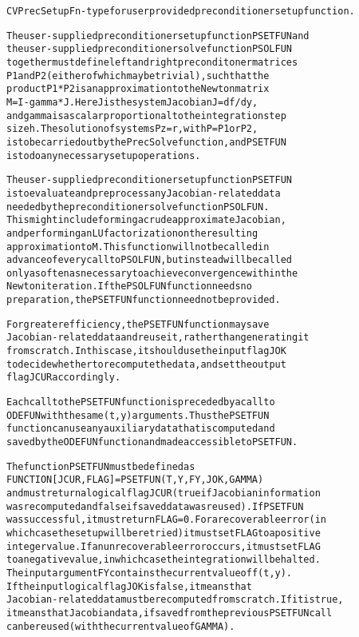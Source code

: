 \begin{alltt}
CVPrecSetupFn - type for user provided preconditioner setup function.

   The user-supplied preconditioner setup function PSETFUN and
   the user-supplied preconditioner solve function PSOLFUN
   together must define left and right preconditoner matrices
   P1 and P2 (either of which may be trivial), such that the
   product P1*P2 is an approximation to the Newton matrix
   M = I - gamma*J.  Here J is the system Jacobian J = df/dy,
   and gamma is a scalar proportional to the integration step
   size h.  The solution of systems P z = r, with P = P1 or P2,
   is to be carried out by the PrecSolve function, and PSETFUN
   is to do any necessary setup operations.

   The user-supplied preconditioner setup function PSETFUN
   is to evaluate and preprocess any Jacobian-related data
   needed by the preconditioner solve function PSOLFUN.
   This might include forming a crude approximate Jacobian,
   and performing an LU factorization on the resulting
   approximation to M.  This function will not be called in
   advance of every call to PSOLFUN, but instead will be called
   only as often as necessary to achieve convergence within the
   Newton iteration.  If the PSOLFUN function needs no
   preparation, the PSETFUN function need not be provided.

   For greater efficiency, the PSETFUN function may save
   Jacobian-related data and reuse it, rather than generating it
   from scratch.  In this case, it should use the input flag JOK
   to decide whether to recompute the data, and set the output
   flag JCUR accordingly.

   Each call to the PSETFUN function is preceded by a call to
   ODEFUN with the same (t,y) arguments.  Thus the PSETFUN
   function can use any auxiliary data that is computed and
   saved by the ODEFUN function and made accessible to PSETFUN.

   The function PSETFUN must be defined as 
        FUNCTION [JCUR, FLAG] = PSETFUN(T,Y,FY,JOK,GAMMA)
   and must return a logical flag JCUR (true if Jacobian information
   was recomputed and false if saved data was reused). If PSETFUN
   was successful, it must return FLAG=0. For a recoverable error (in    
   which case the setup will be retried) it must set FLAG to a positive
   integer value. If an unrecoverable error occurs, it must set FLAG
   to a negative value, in which case the integration will be halted.
   The input argument FY contains the current value of f(t,y).
   If the input logical flag JOK is false, it means that
   Jacobian-related data must be recomputed from scratch. If it is true,
   it means that Jacobian data, if saved from the previous PSETFUN call
   can be reused (with the current value of GAMMA).


\end{alltt}
